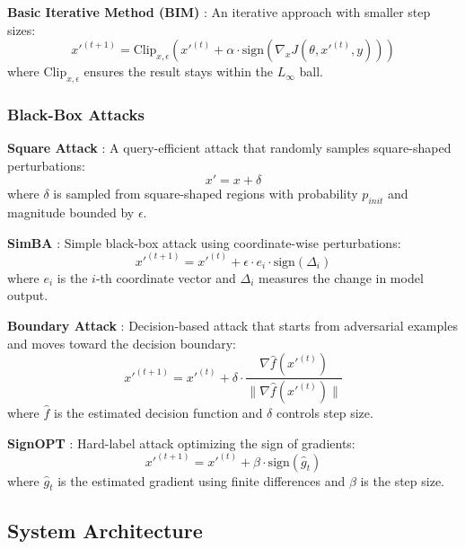 \textbf{Basic Iterative Method (BIM)} \cite{kurakin2016adversarial}: An iterative approach with smaller step sizes:
\begin{equation}
x'^{(t+1)} = \text{Clip}_{x,\epsilon} \left( x'^{(t)} + \alpha \cdot \text{sign}(\nabla_x J(\theta, x'^{(t)}, y)) \right)
\end{equation}
where $\text{Clip}_{x,\epsilon}$ ensures the result stays within the $L_\infty$ ball.

\subsubsection{Black-Box Attacks}

\textbf{Square Attack} \cite{andriushchenko2020square}: A query-efficient attack that randomly samples square-shaped perturbations:
\begin{equation}
x' = x + \delta
\end{equation}
where $\delta$ is sampled from square-shaped regions with probability $p_{init}$ and magnitude bounded by $\epsilon$.

\textbf{SimBA} \cite{guo2019simple}: Simple black-box attack using coordinate-wise perturbations:
\begin{equation}
x'^{(t+1)} = x'^{(t)} + \epsilon \cdot e_i \cdot \text{sign}(\Delta_i)
\end{equation}
where $e_i$ is the $i$-th coordinate vector and $\Delta_i$ measures the change in model output.

\textbf{Boundary Attack} \cite{brendel2017decision}: Decision-based attack that starts from adversarial examples and moves toward the decision boundary:
\begin{equation}
x'^{(t+1)} = x'^{(t)} + \delta \cdot \frac{\nabla \hat{f}(x'^{(t)})}{\|\nabla \hat{f}(x'^{(t)})\|}
\end{equation}
where $\hat{f}$ is the estimated decision function and $\delta$ controls step size.

\textbf{SignOPT} \cite{cheng2019sign}: Hard-label attack optimizing the sign of gradients:
\begin{equation}
x'^{(t+1)} = x'^{(t)} + \beta \cdot \text{sign}(\hat{g}_t)
\end{equation}
where $\hat{g}_t$ is the estimated gradient using finite differences and $\beta$ is the step size.

\subsection{System Architecture}

